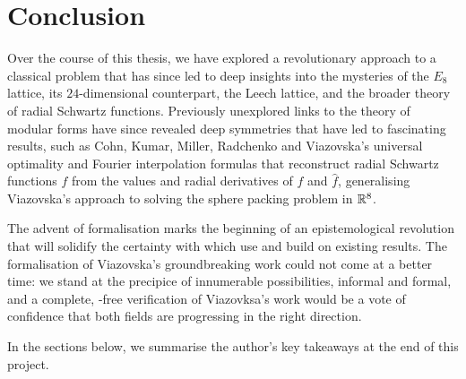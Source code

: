 \chapter{Conclusion}
\label{Ch6:Chapter}
\thispagestyle{empty}

Over the course of this thesis, we have explored a revolutionary approach to a classical problem that has since led to deep insights into the mysteries of the $E_8$ lattice, its $24$-dimensional counterpart, the Leech lattice, and the broader theory of radial Schwartz functions. Previously unexplored links to the theory of modular forms have since revealed deep symmetries that have led to fascinating results, such as Cohn, Kumar, Miller, Radchenko and Viazovska's universal optimality and Fourier interpolation formulas \cite{UniversalOptimality} that reconstruct radial Schwartz functions $f$ from the values and radial derivatives of $f$ and $\hat{f}$, generalising Viazovska's approach to solving the sphere packing problem in $\mathbb{R}^8$.

The advent of formalisation marks the beginning of an epistemological revolution that will solidify the certainty with which use and build on existing results. The formalisation of Viazovska's groundbreaking work could not come at a better time: we stand at the precipice of innumerable possibilities, informal and formal, and a complete, \sorry-free verification of Viazovksa's work would be a vote of confidence that both fields are progressing in the right direction.

In the sections below, we summarise the author's key takeaways at the end of this project.




